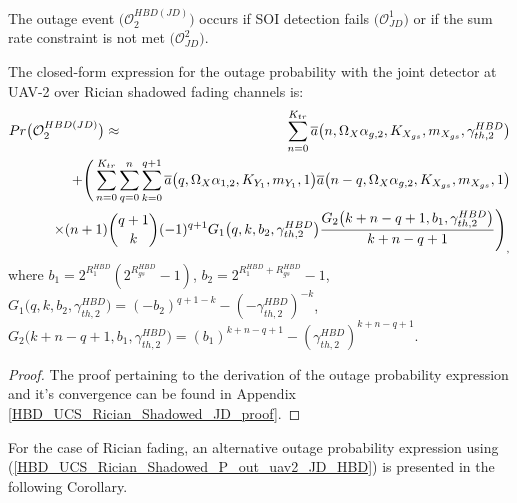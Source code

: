 The outage event $\big(\mathcal{O}_{2}^{HBD(JD)}\big)$ occurs if SOI detection fails $\big(\mathcal{O}_{JD}^{1}\big)$ or if the sum rate constraint is not met $\big(\mathcal{O}_{JD}^{2}\big)$.
\begin{theorem} \label{HBD_UCS_Rician_Shadowed_P_out_uav2_JD_HBD_theorem}
The closed-form expression for the outage probability with the joint detector at UAV-2 over Rician shadowed fading channels is:
\begin{eqnarray} \label{HBD_UCS_Rician_Shadowed_P_out_uav2_JD_HBD}
 Pr\big(\mathcal{O}_{2}^{HBD(JD)}\big) & \approx & \sum_{n=0}^{K_{tr}} \overline{a}\big(n,\Omega_X\alpha_{g,2},K_{X_{gs}},m_{X_{gs}},\gamma_{th,2}^{HBD}\big)  \nonumber\\
 & & \hspace{-2cm} + \Bigg( \sum_{n=0}^{K_{tr}}\sum_{q=0}^{n}\sum_{k=0}^{q+1} \overline{a}\big(q,\Omega_X\alpha_{1,2},K_{Y_1},m_{Y_1},1\big) \overline{a}\big(n-q,\Omega_X\alpha_{g,2},K_{X_{gs}},m_{X_{gs}},1\big) \nonumber \\
 & & \hspace{-2cm} \times (n+1) \binom{q+1}{k}(-1)^{q+1}  G_1\big(q,k,b_2,\gamma_{th,2}^{HBD}\big) \frac{G_2\big(k+n-q+1,b_1,\gamma_{th,2}^{HBD}\big)}{k+n-q+1}\Bigg)_,
\end{eqnarray}
where $b_1 = 2^{R_{1}^{HBD}}(2^{R_{gs}^{HBD}}-1)$, $b_2 = 2^{R_{1}^{HBD}+R_{gs}^{HBD}}-1$, $G_1\big(q,k,b_2,\gamma_{th,2}^{HBD}\big)=(-b_2)^{q+1-k} - (-\gamma_{th,2}^{HBD})^{-k}$, $G_2\big(k+n-q+1,b_1,\gamma_{th,2}^{HBD}\big) = (b_1)^{k+n-q+1} - (\gamma_{th,2}^{HBD})^{k+n-q+1}$.
\end{theorem}
\begin{proof}
The proof pertaining to the derivation of the outage probability expression and it's convergence can be found in Appendix \ref{HBD_UCS_Rician_Shadowed_JD_proof}.
\end{proof}

For the case of Rician fading, an alternative outage probability expression using (\ref{HBD_UCS_Rician_Shadowed_P_out_uav2_JD_HBD}) is presented in the following Corollary.

